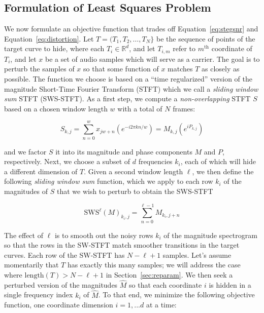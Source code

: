 \documentclass[runningheads]{llncs}
\begin{document}
\subsection{Formulation of Least Squares Problem}

We now formulate an objective function that trades off Equation~\ref{eq:stegsnr} and Equation~\ref{eq:distortion}.  Let $T = (T_1, T_2, \hdots, T_N \}$ be the sequence of points of the target curve to hide, where each $T_i \in \mathbb{R}^d$, and let $T_{i, m}$ refer to $m^{\text{th}}$ coordinate of $T_i$, and let $x$ be a set of audio samples which will serve as a carrier.  The goal is to perturb the samples of $x$ so that some function of $x$ matches $T$ as closely as possible.  The function we choose is based on a ``time regularized'' version of the magnitude Short-Time Fourier Transform (STFT) which we call a {\em sliding window sum} STFT (SWS-STFT).  As a first step, we compute a {\em non-overlapping} STFT $S$ based on a chosen window length $w$ with a total of $N$ frames:

\begin{equation}
  S_{k, j} = \sum_{n = 0}^w x_{jw + n} \left(e^{-i 2 \pi k n / w} \right) = M_{k, j} \left( e^{i P_{k, j}} \right)
\end{equation}

and we factor $S$ it into its magnitude and phase components $M$ and $P$, respectively.  Next, we choose a subset of $d$ frequencies $k_i$, each of which will hide a different dimension of $T$.  Given a second window length $\ell$, we then define the following {\em sliding window sum} function, which we apply to each row $k_i$ of the magnitudes of $S$ that we wish to perturb to obtain the SWS-STFT

\begin{equation}
  \text{SWS}^{\ell}(M)_{k_i, j} = \sum_{n = 0}^{\ell-1} M_{k_i, j+n}
\end{equation}

The effect of $\ell$ is to smooth out the noisy rows $k_i$ of the magnitude spectrogram so that the rows in the SW-STFT match smoother transitions in the target curves.  Each row of the SW-STFT has $N-\ell+1$ samples.  Let's assume momentarily that $T$ has exactly this many samples; we will address the case where $\text{length}(T) > N-\ell+1$ in Section~\ref{sec:reparam}.  We then seek a perturbed version of the magnitudes $\hat{M}$ so that each coordinate $i$ is hidden in a single frequency index $k_i$ of $\hat{M}$.  To that end, we minimize the following objective function, one coordinate dimension $i = 1, ... d$ at a time:
\end{document}
